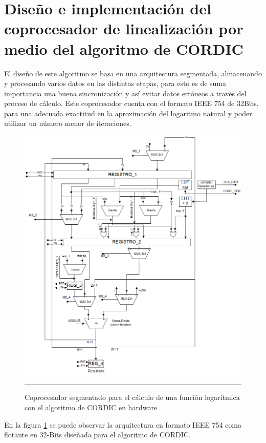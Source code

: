 \section{Diseño e implementación del coprocesador de linealización por medio del algoritmo de CORDIC}
El diseño de este algoritmo se basa en una arquitectura segmentada, almacenando y procesando varios datos en las distintas etapas, para esto es de suma importancia una buena sincronización y así evitar datos erróneos a través del proceso de cálculo. Este coprocesador cuenta con el formato IEEE 754 de 32Bits, para una adecuada exactitud en la aproximación del logaritmo natural y poder utilizar un número menor de iteraciones.

\begin{figure}[H]
  \centering
    \includegraphics[scale=0.055]{./CORDICLN.png}
    \rule{35em}{0.5pt}
  \caption[Coprocesador segmentado para el cálculo de una función logarítmica con el algoritmo de CORDIC en hardware]{Coprocesador segmentado para el cálculo de una función logarítmica con el algoritmo de CORDIC en hardware  }
  \label{fig:CORDICLN}
\end{figure}
\newpage

En la figura \ref{fig:CORDICLN} se puede observar la arquitectura en formato IEEE 754 coma flotante en 32-Bits diseñada para el algoritmo de CORDIC.  

